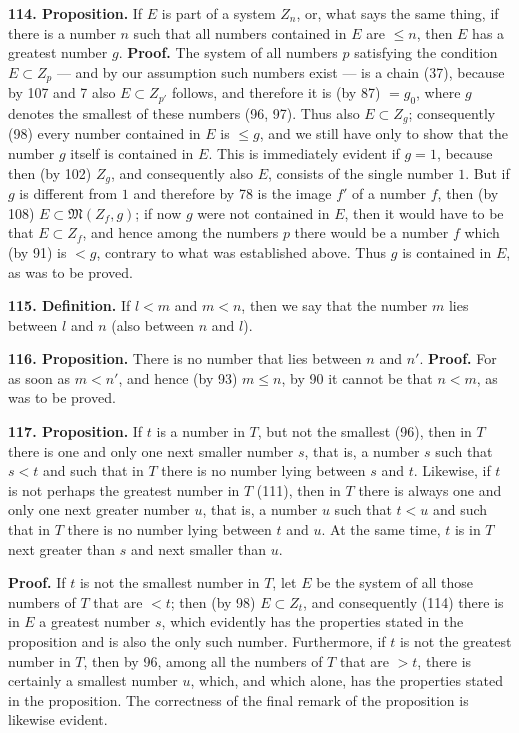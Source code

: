 \documentclass[11pt]{article}
\newcommand{\Mf}{\mathfrak{M}}
\newcommand{\partof}{\mathrel{\subset}}
\begin{document}
\noindent\textbf{114. Proposition.} If $E$ is part of a system $Z_n$, or, what says the same thing, if there is a number $n$ such that all numbers contained in $E$ are $\le n$, then $E$ has a greatest number $g$. \textbf{Proof.} The system of all numbers $p$ satisfying the condition $E\partof Z_p$ — and by our assumption such numbers exist — is a chain (37), because by 107 and 7 also $E\partof Z_{p'}$ follows, and therefore it is (by 87) $=g_0$, where $g$ denotes the smallest of these numbers (96, 97). Thus also $E\partof Z_g$; consequently (98) every number contained in $E$ is $\le g$, and we still have only to show that the number $g$ itself is contained in $E$. This is immediately evident if $g=1$, because then (by 102) $Z_g$, and consequently also $E$, consists of the single number $1$. But if $g$ is different from $1$ and therefore by 78 is the image $f'$ of a number $f$, then (by 108) $E\partof\Mf(Z_f,g)$; if now $g$ were not contained in $E$, then it would have to be that $E\partof Z_f$, and hence among the numbers $p$ there would be a number $f$ which (by 91) is $<g$, contrary to what was established above. Thus $g$ is contained in $E$, as was to be proved.

\noindent\textbf{115. Definition.} If $l<m$ and $m<n$, then we say that the number $m$ lies between $l$ and $n$ (also between $n$ and $l$).

\noindent\textbf{116. Proposition.} There is no number that lies between $n$ and $n'$. \textbf{Proof.} For as soon as $m<n'$, and hence (by 93) $m\le n$, by 90 it cannot be that $n<m$, as was to be proved.

\noindent\textbf{117. Proposition.} If $t$ is a number in $T$, but not the smallest (96), then in $T$ there is one and only one next smaller number $s$, that is, a number $s$ such that $s<t$ and such that in $T$ there is no number lying between $s$ and $t$. Likewise, if $t$ is not perhaps the greatest number in $T$ (111), then in $T$ there is always one and only one next greater number $u$, that is, a number $u$ such that $t<u$ and such that in $T$ there is no number lying between $t$ and $u$. At the same time, $t$ is in $T$ next greater than $s$ and next smaller than $u$.

\textbf{Proof.} If $t$ is not the smallest number in $T$, let $E$ be the system of all those numbers of $T$ that are $<t$; then (by 98) $E\partof Z_t$, and consequently (114) there is in $E$ a greatest number $s$, which evidently has the properties stated in the proposition and is also the only such number. Furthermore, if $t$ is not the greatest number in $T$, then by 96, among all the numbers of $T$ that are $>t$, there is certainly a smallest number $u$, which, and which alone, has the properties stated in the proposition. The correctness of the final remark of the proposition is likewise evident.
\end{document}
